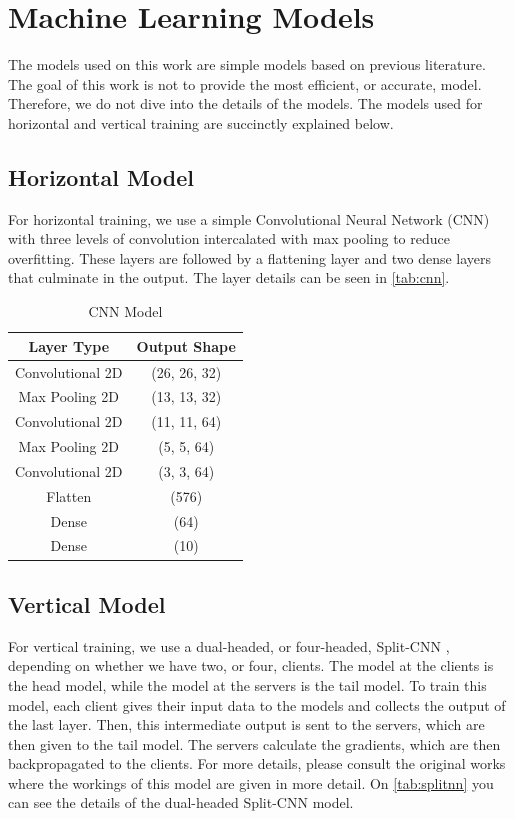 \section{Machine Learning Models}\label{eval:ml_models}

The models used on this work are simple models based on previous literature. The goal of this work is not to provide the most efficient, or accurate, model. Therefore, we do not dive into the details of the models. The models used for horizontal and vertical training are succinctly explained below.

\subsection{Horizontal Model}

For horizontal training, we use a simple Convolutional Neural Network (CNN) with three levels of convolution intercalated with max pooling to reduce overfitting. These layers are followed by a flattening layer and two dense layers that culminate in the output. The layer details can be seen in \autoref{tab:cnn}.

\begin{table}[!h]
    \begin{tabular}{c|c}
        \hline \hline
        Layer Type       & Output Shape \\ \hline \hline
        Convolutional 2D & (26, 26, 32) \\ \hline
        Max Pooling 2D   & (13, 13, 32) \\ \hline
        Convolutional 2D & (11, 11, 64) \\ \hline
        Max Pooling 2D   & (5, 5, 64)   \\ \hline
        Convolutional 2D & (3, 3, 64)   \\ \hline
        Flatten          & (576)        \\ \hline
        Dense            & (64)         \\ \hline
        Dense            & (10)         \\ \hline
    \end{tabular}
    \caption{CNN Model}
    \label{tab:cnn}
\end{table}

\subsection{Vertical Model}

For vertical training, we use a dual-headed, or four-headed, Split-CNN \cite{10.1145/3297858.3304038, 10.48550/arxiv.2104.00489}, depending on whether we have two, or four, clients. The model at the clients is the head model, while the model at the servers is the tail model. To train this model, each client gives their input data to the models and collects the output of the last layer. Then, this intermediate output is sent to the servers, which are then given to the tail model. The servers calculate the gradients, which are then backpropagated to the clients. For more details, please consult the original works where the workings of this model are given in more detail. On \autoref{tab:splitnn} you can see the details of the dual-headed Split-CNN model.

